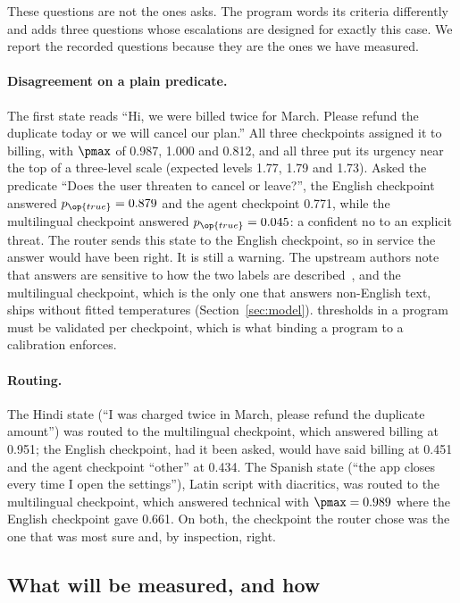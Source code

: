These questions are not the ones  asks. The program
words its criteria differently and adds three  questions whose
escalations are designed for exactly this case. We report the recorded
questions because they are the ones we have measured.

\paragraph{Disagreement on a plain predicate.}
The first state reads ``Hi, we were billed twice for March. Please refund the
duplicate today or we will cancel our plan.'' All three checkpoints assigned it
to billing, with $\pmax$ of 0.987, 1.000 and 0.812, and all three put its
urgency near the top of a three-level scale (expected levels 1.77, 1.79 and
1.73). Asked the predicate ``Does the user threaten to cancel or leave?'', the
English checkpoint answered $p_{\op{true}} = 0.879$ and the agent checkpoint
0.771, while the multilingual checkpoint answered $p_{\op{true}} = 0.045$: a
confident no to an explicit threat. The router sends this state to the English
checkpoint, so in service the answer would have been right. It is still a
warning. The upstream authors note that  answers are sensitive to how
the two labels are described~\cite{laya}, and the multilingual checkpoint, which
is the only one that answers non-English text, ships without fitted
temperatures (Section~\ref{sec:model}).  thresholds in a program must
be validated per checkpoint, which is what binding a program to a calibration
enforces.

\paragraph{Routing.}
The Hindi state (``I was charged twice in March, please refund the duplicate
amount'') was routed to the multilingual checkpoint, which answered
billing at 0.951; the English checkpoint, had it been asked, would have said
billing at 0.451 and the agent checkpoint ``other'' at 0.434. The Spanish state
(``the app closes every time I open the settings''), Latin script with
diacritics, was routed to the multilingual checkpoint, which
answered technical with $\pmax = 0.989$ where the English checkpoint gave 0.661. On both,
the checkpoint the router chose was the one that was most sure and, by
inspection, right.

\subsection{What will be measured, and how}
\label{sec:eval-plan}

